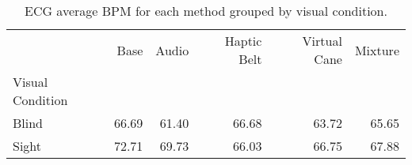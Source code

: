 
\begin{table}[!htb]
\centering
\caption{ECG average BPM for each method grouped by visual condition.}
\label{tab:bpm_average_group}
\begin{tabular}{lrrrrr}
\toprule
{} &   Base &  Audio & Haptic Belt & Virtual Cane & Mixture \\
Visual Condition &        &        &             &              &         \\
\midrule
Blind            &  66.69 &  61.40 &       66.68 &        63.72 &   65.65 \\
Sight            &  72.71 &  69.73 &       66.03 &        66.75 &   67.88 \\
\bottomrule
\end{tabular}
\end{table}

